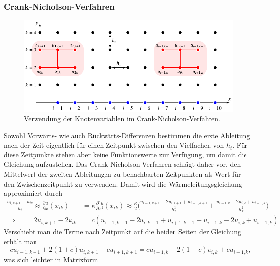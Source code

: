 \subsubsection{Crank-Nicholson-Verfahren}
\begin{figure}
\centering
\includegraphics{chapters/70-pde/images/cngrid.pdf}
\caption{Verwendung der Knotenvariablen im Crank-Nicholson-Verfahren.
\label{buch:pde:figure:cngrid}}
\end{figure}
%
Sowohl Vorwärts- wie auch Rückwärts-Differenzen bestimmen die erste
Ableitung nach der Zeit eigentlich für einen Zeitpunkt zwischen 
den Vielfachen von $h_t$.
Für diese Zeitpunkte stehen aber keine Funktionswerte zur Verfügung, 
um damit die Gleichung aufzustellen.
Das Crank-Nicholson-Verfahren schlägt daher vor, den Mittelwert der
zweiten Ableitungen zu benachbarten Zeitpunkten als Wert für den
Zwischenzeitpunkt zu verwenden.
Damit wird die Wärmeleitungsgleichung approximiert durch
\begin{align*}
\frac{u_{i,k+1}-u_{ik}}{h_t}
\approx
\frac{\partial u}{\partial x}(x_{ik})
&=
\kappa
\frac{\partial^2 u}{\partial x^2}(x_{ik})
\approx
\frac{\kappa}2\biggl(
\frac{u_{i-1,k+1}-2u_{i,k+1}+u_{i+1,k+1}}{h_x^2}
+
\frac{u_{i-1,k}-2u_{i,k}+u_{i+1,k}}{h_x^2}
\biggr)
\\
\Rightarrow\hspace{1cm}
2u_{i,k+1}-2u_{ik}
&=
c(
u_{i-1,k+1}-2u_{i,k+1}+u_{i+1,k+1}
+
u_{i-1,k}-2u_{i,k}+u_{i+1,k}
)
\end{align*}
Verschiebt man die Terme nach Zeitpunkt auf die beiden Seiten
der Gleichung erhält man
\begin{equation}
-cu_{i-1,k+1}+2(1+c)u_{i,k+1}-cu_{i+1,k+1}
=
cu_{i-1,k}+2(1-c)u_{i,k}+cu_{i+1,k},
\end{equation}
was sich leichter in Matrixform 
